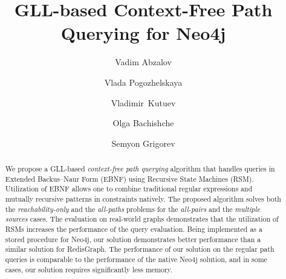 \documentclass[
11pt,%
tightenlines,%
twoside,%
onecolumn,%
nobibnotes,%
nofootinbib,%
superscriptaddress,%
noshowpacs,%
longbibliography,%
centertags]%
{revtex4-2}
\begin{document}
\nocite{REVTEX42Control}
%
\title{GLL-based Context-Free Path Querying for Neo4j}


\author{Vadim Abzalov}

\author{Vlada Pogozhelskaya}

\author{Vladimir~Kutuev}

\author{Olga Bachishche}

\author{Semyon Grigorev}




\begin{abstract}
We propose a GLL-based \textit{context-free path querying} algorithm that handles queries in Extended Backus--Naur Form (EBNF) using Recursive State Machines (RSM). Utilization of EBNF allows one to combine traditional regular expressions and mutually recursive patterns in constraints natively. The proposed algorithm solves both the \textit{reachability-only} and the \textit{all-paths} problems for the \textit{all-pairs} and the \textit{multiple sources} cases. The evaluation on real-world graphs demonstrates that the utilization of RSMs increases the performance of the query evaluation. Being implemented as a stored procedure for Neo4j, our solution demonstrates better performance than a similar solution for RedisGraph. The performance of our solution on the regular path queries is comparable to the performance of the native Neo4j solution, and in some cases, our solution requires significantly less memory.
\end{abstract}

\end{document}

